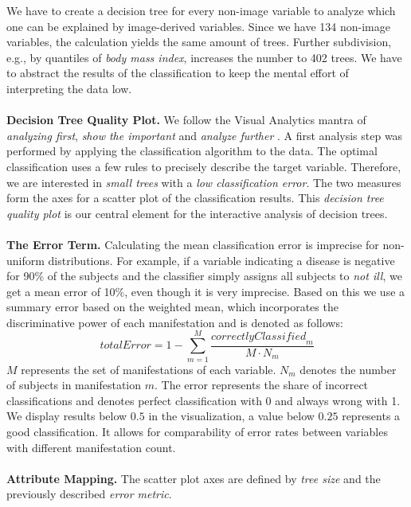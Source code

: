 \documentclass[a4paper,twoside]{style/article}
\begin{document}
We have to create a decision tree for every non-image variable to analyze which one can be explained by image-derived variables.
Since we have 134 non-image variables, the calculation yields the same amount of trees.
Further subdivision, e.g., by quantiles of \emph{body mass index}, increases the number to 402 trees.
We have to abstract the results of the classification to keep the mental effort of interpreting the data low.
\\\\
\noindent \textbf{Decision Tree Quality Plot.}
We follow the Visual Analytics mantra of \emph{analyzing first}, \emph{show the important} and \emph{analyze further} \cite{Keim}.
A first analysis step was performed by applying the classification algorithm to the data.
The optimal classification uses a few rules to precisely describe the target variable.
Therefore, we are interested in \emph{small trees} with a \emph{low classification error}.
The two measures form the axes for a scatter plot of the classification results.
This \emph{decision tree quality plot} is our central element for the interactive analysis of decision trees.
\\\\
\noindent \textbf{The Error Term.}
Calculating the mean classification error is imprecise for non-uniform distributions.
For example, if a variable indicating a disease is negative for 90\% of the subjects and the classifier simply assigns all subjects to \emph{not ill}, we get a mean error of 10\%, even though it is very imprecise.
Based on this we use a summary error based on the weighted mean, which incorporates the discriminative power of each manifestation and is denoted as follows:
\begin{equation}
\textit{totalError} = 1 - \sum_{m=1}^M \frac{\textit{correctlyClassified}_{m}}{M\cdot N_m}
\end{equation}
$M$ represents the set of manifestations of each variable.
$N_m$ denotes the number of subjects in manifestation $m$.
The error represents the share of incorrect classifications and denotes perfect classification with 0 and always wrong with 1. %
We display results below $0.5$ in the visualization, a value below $0.25$ represents a good classification.
It allows for comparability of error rates between variables with different manifestation count.
\\\\
\textbf{Attribute Mapping.}
The scatter plot axes are defined by \emph{tree size} and the previously described \emph{error metric}.
\end{document}
